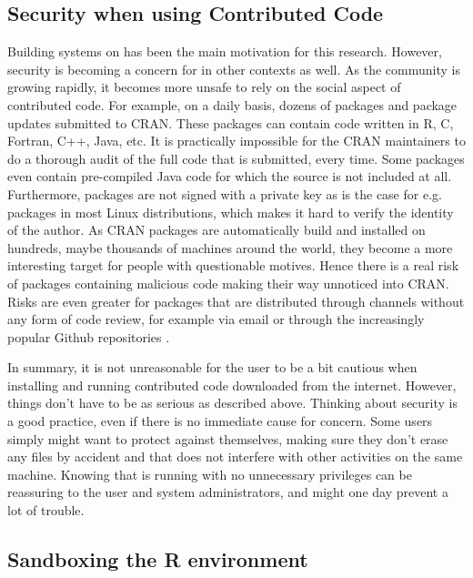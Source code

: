 \documentclass[article]{jss}
\begin{document}
\subsection{Security when using Contributed Code}

Building systems on  has been the main motivation for this research.
However, security is becoming a concern for  in other contexts as
well. As the  community is growing rapidly, it becomes more unsafe
to rely on the social aspect of contributed code. For example, on a daily
basis, dozens of packages and package updates submitted to CRAN. These packages
can contain code written in R, C, Fortran, C++, Java, etc. It is practically
impossible for the CRAN maintainers to do a thorough audit of the full code
that is submitted, every time. Some packages even contain pre-compiled Java code
for which the source is not included at all. Furthermore,  packages
are not signed with a private key as is the case for e.g. packages in most Linux
distributions, which makes it hard to verify the identity of the author. As
CRAN packages are automatically build and installed on hundreds, maybe thousands
of machines around the world, they become a more interesting target for people
with questionable motives. Hence there is a real risk of packages containing
malicious code making their way unnoticed into CRAN. Risks are even greater for
packages that are distributed through channels without any form of code review,
for example via email or through the increasingly popular Github repositories
\citep{torvalds2006git,dabbish2012social}.

In summary, it is not unreasonable for the  user to be a bit
cautious when installing and running contributed code downloaded from the
internet. However, things don't have to be as serious as described above.
Thinking about security is a good practice, even if there is no immediate cause
for concern. Some users simply might want to protect against themselves, making
sure they don't erase any files by accident and that  does not
interfere with other activities on the same machine. Knowing that 
is running with no unnecessary privileges can be reassuring to the user and
system administrators, and might one day prevent a lot of trouble. 

\subsection{Sandboxing the R environment}
\end{document}
